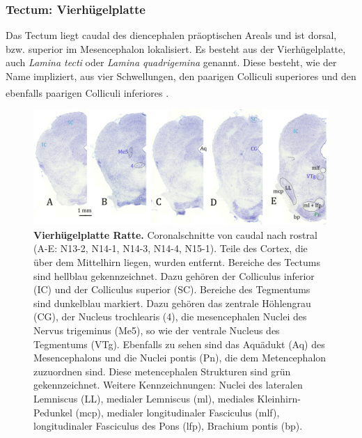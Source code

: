 \documentclass[12pt,a4paper,pdftex]{article}
\begin{document}
\subsubsection{Tectum: Vierhügelplatte}
 
\label{subsubsec:Tectum}
Das Tectum liegt caudal des diencephalen präoptischen Areals und ist dorsal, bzw. superior im Mesencephalon lokalisiert. Es besteht aus der Vierhügelplatte, auch \textit{Lamina tecti} oder \textit{Lamina quadrigemina} genannt. Diese besteht, wie der Name impliziert, aus vier Schwellungen, den paarigen Colliculi superiores und den ebenfalls paarigen Colliculi inferiores \textsuperscript{\cite[6]{trepel2011neuroanatomie}}.

\begin{figure}[H]
    \centering
    \includegraphics[width=\textwidth]{pictures/Bilder_Jule/Ratte/SC_IC.png}
    \caption[Vierhügelplatte Ratte]{\textbf{Vierhügelplatte Ratte.} Coronalschnitte von caudal nach rostral (A-E: N13-2, N14-1, N14-3, N14-4, N15-1). Teile des Cortex, die über dem Mittelhirn liegen, wurden entfernt. Bereiche des Tectums sind hellblau gekennzeichnet. Dazu gehören der Colliculus inferior (IC) und der Colliculus superior (SC). Bereiche des Tegmentums sind dunkelblau markiert. Dazu gehören das zentrale Höhlengrau (CG), der Nucleus trochlearis (4), die mesencephalen Nuclei des Nervus trigeminus (Me5), so wie der ventrale Nucleus des Tegmentums (VTg). Ebenfalls zu sehen sind das Aquädukt (Aq) des Mesencephalons und die Nuclei pontis (Pn), die dem Metencephalon zuzuordnen sind. Diese metencephalen Strukturen sind grün gekennzeichnet. Weitere Kennzeichnungen: Nuclei des lateralen Lemniscus (LL), medialer Lemniscus (ml), mediales Kleinhirn-Pedunkel (mcp), medialer longitudinaler Fasciculus (mlf), longitudinaler Fasciculus des Pons (lfp), Brachium pontis (bp).  }
    \label{fig:vierhuegelplatte_ratte}
\end{figure}{}
\end{document}
